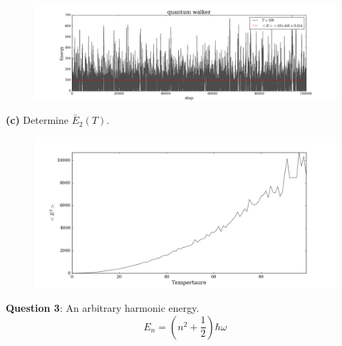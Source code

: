\documentclass{article}
\begin{document}
\begin{figure}[H]
\begin{center}
\includegraphics[width=16cm]{../output/quantum/walkers.png} 
\end{center}
\end{figure}

\textbf{(c)} Determine $\bar{E}_{2}(T)$. 

\begin{figure}[H]
\begin{center}
\includegraphics[width=16cm]{../output/quantum/expected_sq.png} 
\end{center}
\end{figure}


\bigskip
\textbf{Question 3}: An arbitrary harmonic energy. 
	\[E_{n} = \left(n^2 + \frac{1}{2} \right)\hbar\omega \]
\end{document}
